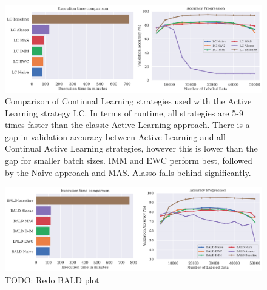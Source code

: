 \begin{figure} [ht]
    \centering
    \includegraphics[width=\linewidth]{images/results_CAL/LC_CAL_4000b.png}
    \caption[Continual Active Learning Random 4000 batch size]{Comparison of Continual Learning strategies used with the Active Learning strategy LC. In terms of runtime, all
    strategies are 5-9 times faster than the classic Active Learning approach. There is a gap in validation accuracy between Active Learning and all Continual
    Active Learning strategies, however this is lower than the gap for smaller batch sizes. IMM and EWC perform best, followed by the Naive approach and MAS. Alasso falls behind
    significantly.}
    \label{fig:Evaluation:Results:CAL:LC4000}
\end{figure}

\begin{figure} [ht]
    \centering
    \includegraphics[width=\linewidth]{images/results_CAL/Bald_CAL_4000b.png}
    \caption[Continual Active Learning BALD 4000 batch size]{TODO: Redo BALD plot}
    \label{fig:Evaluation:Results:CAL:BALD4000}
\end{figure}

